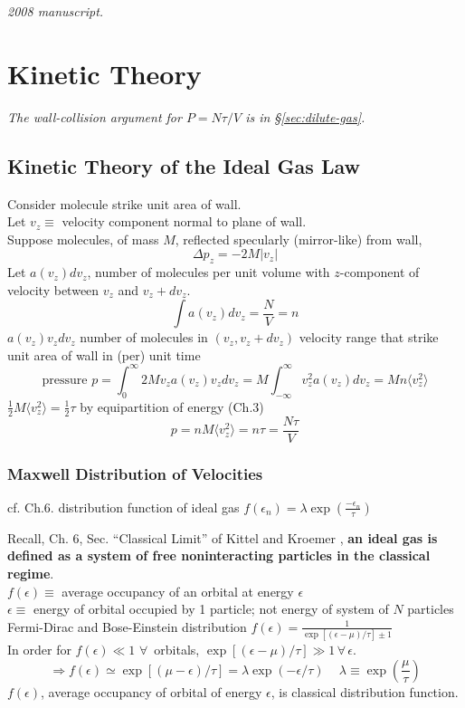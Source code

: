 \noindent\textit{2008 manuscript.}

\section{Kinetic Theory}

\noindent\textit{The wall-collision argument for \(P=N\tau/V\) is in \S\ref{sec:dilute-gas}.}

\subsection*{Kinetic Theory of the Ideal Gas Law}

Consider molecule strike unit area of wall. \\
Let $v_z \equiv $ velocity component normal to plane of wall. \\
Suppose molecules, of mass $M$, reflected specularly (mirror-like) from wall,
\[
\Delta p_z = -2M|v_z|
\]
Let $a(v_z)dv_z$, number of molecules per unit volume with $z$-component of velocity between $v_z$ and $v_z + dv_z$.  
\[
\int a(v_z)dv_z = \frac{N}{V} = n
\]
$a(v_z) v_z dv_z$ number of molecules in $(v_z, v_z + dv_z)$  velocity range that strike unit area of wall in (per) unit time
\[
\text{pressure } p = \int_0^{\infty}2M v_za(v_z)v_z dv_z = M\int_{-\infty}^{\infty}v_z^2 a(v_z) dv_z = Mn\langle v_z^2 \rangle
\]
$\frac{1}{2}M\langle v_z^2 \rangle = \frac{1}{2} \tau$ by equipartition of energy (Ch.3)
\[
p = nM \langle v_z^2 \rangle = n\tau = \frac{N\tau}{V}
\]
\subsubsection*{Maxwell Distribution of Velocities}  

cf. Ch.6. distribution function of ideal gas $f(\epsilon_n) = \lambda \exp{ \left( \frac{-\epsilon_n}{\tau} \right)}$

Recall, Ch. 6, Sec. ``Classical Limit'' of Kittel and Kroemer \cite{CKittelHKroemer1980}, \textbf{an ideal gas is defined as a system of free noninteracting particles in the classical regime}.  \\
$f(\epsilon) \equiv $ average occupancy of an orbital at energy $\epsilon$ \\
$\epsilon \equiv $ energy of orbital occupied by 1 particle; not energy of system of $N$ particles \\
Fermi-Dirac and Bose-Einstein distribution $f(\epsilon) = \frac{1}{ \exp{ [ (\epsilon - \mu )/\tau ] } \pm 1 }$ \\
In order for $f(\epsilon) \ll 1$ $\forall \, $ orbitals, $\exp{ [ (\epsilon-\mu)/\tau ] } \gg 1\, \forall \, \epsilon$.  
\[
\Longrightarrow f(\epsilon) \simeq \exp{ [(\mu - \epsilon )/\tau]} = \lambda \exp{ (-\epsilon/\tau)} \quad \, \lambda \equiv \exp{ \left( \frac{ \mu }{\tau} \right) }
\]
$f(\epsilon)$, average occupancy of orbital of energy $\epsilon$, is classical distribution function.  

